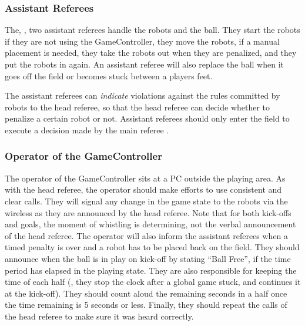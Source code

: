 \subsubsection{Assistant Referees}
\label{sec:assist_referee}
The, , two assistant referees handle the robots and the ball. They start the robots if they are not using the GameController, they move the robots, if a manual placement is needed, they take the robots out when they are penalized, and they put the robots in again. An assistant referee will also replace the ball when it goes off the field or becomes stuck between a players feet.


The assistant referees can \textit{indicate} violations against the rules committed by robots to the head referee, so that the head referee can decide whether to penalize a certain robot or not. Assistant referees should only enter the field to execute a decision made by the main referee .

\subsubsection{Operator of the GameController}
\label{sec:gameControllerOp}
The operator of the GameController sits at a PC outside the playing area.
As with the head referee, the operator should make efforts to use consistent and clear calls.
They will signal any change in the game state to the robots via the wireless as they are announced by the head referee.
Note that for both kick-offs and goals, the moment of whistling is determining, not the verbal announcement of the head referee.
The operator will also inform the assistant referees when a timed penalty is over and a robot has to be placed back on the field.
They should announce when the ball is in play on kick-off by stating ``Ball Free'', if the \KickOffBallFreeTime time period has elapsed in the playing state.
They are also responsible for keeping the time of each half (\ie, they stop the clock after a global game stuck, and continues it at the kick-off).
They should count aloud the remaining seconds in a half once the time remaining is 5 seconds or less.
Finally, they should repeat the calls of the head referee to make sure it was heard correctly.

